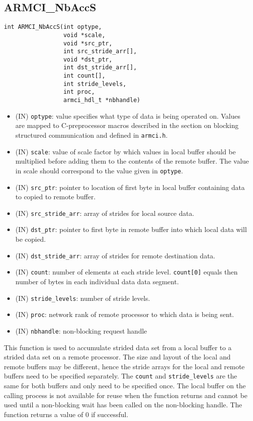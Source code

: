 \documentclass[12pt]{article}
\begin{document}
\subsection{ARMCI\_NbAccS}
\begin{verbatim}
int ARMCI_NbAccS(int optype,
                 void *scale,
                 void *src_ptr,
                 int src_stride_arr[],
                 void *dst_ptr,
                 int dst_stride_arr[],
                 int count[],
                 int stride_levels,
                 int proc,
                 armci_hdl_t *nbhandle)
\end{verbatim}
\begin{itemize}
\item (IN) \texttt{optype}: value specifies what type of data is being operated
on. Values are mapped to C-preprocessor macros described in the section on
blocking structured communication and defined in \texttt{armci.h}.
\item (IN) \texttt{scale}: value of scale factor by which values in local buffer
should be multiplied before adding them to the contents of the remote buffer.
The value in scale should correspond to the value given in \texttt{optype}.
\item (IN) \texttt{src\_ptr}: pointer to location of first byte in local buffer
containing data to copied to remote buffer.
\item (IN) \texttt{src\_stride\_arr}: array of strides for local source data.
\item (IN) \texttt{dst\_ptr}: pointer to first byte in remote buffer into which local
data will be copied.
\item (IN) \texttt{dst\_stride\_arr}: array of strides for remote destination data.
\item (IN) \texttt{count}: number of elements at each stride level.
\texttt{count[0]} equals then number of bytes in each individual data data segment.
\item (IN) \texttt{stride\_levels}: number of stride levels.
\item (IN) \texttt{proc}: network rank of remote processor to which data is
being sent.
\item (IN) \texttt{nbhandle}: non-blocking request handle
\end{itemize}
This function is used to accumulate strided data set from a local buffer to a
strided data set on a remote processor. The size and layout of the local and
remote buffers may be different, hence the stride arrays for the local and
remote buffers need to be specified separately. The \texttt{count} and
\texttt{stride\_levels} are the same for both buffers and only need to be
specified once. The local buffer on the calling process is not available for reuse
when the function returns and cannot be used until a non-blocking wait has been
called on the non-blocking handle. The function returns a value of 0
if successful.
\end{document}
